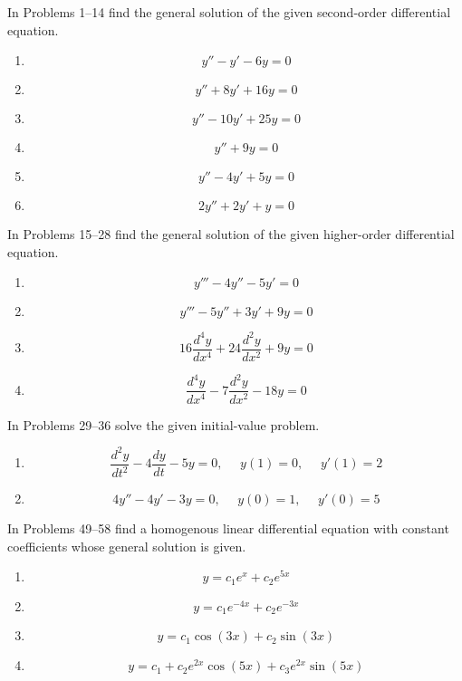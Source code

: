 \documentclass[12pt]{report}
\newcommand{\ivpsep}{\mbox{{ }{ }}}
\begin{document}

In Problems 1--14 find the general solution of the given second-order differential equation.
\begin{enumerate}[label=\arabic*.,start=3]
	\item \[ y'' - y' - 6y = 0 \]				%
	\setcounter{enumi}{4}
	\item \[ y'' + 8y' + 16y = 0 \]				%
	\item \[ y'' - 10y' + 25y = 0 \]			%
	\setcounter{enumi}{8}
	\item \[ y'' + 9y = 0 \] 					%
	\setcounter{enumi}{10}
	\item \[ y'' - 4y' + 5y = 0 \] 				%
	\item \[ 2y'' + 2y' + y = 0 \] 				%
\end{enumerate}

In Problems 15--28 find the general solution of the given higher-order differential equation.
\begin{enumerate}[label=\arabic*.,start=15]
	\item \[ y''' - 4y'' - 5y' = 0 \]										%
	\setcounter{enumi}{16}
	\item \[ y''' - 5y'' + 3y' + 9y = 0 \]									%
	\setcounter{enumi}{24}
	\item \[ 16\frac{d^{4}y}{dx^{4}} + 24\frac{d^{2}y}{dx^{2}} + 9y = 0 \]	%
	\item \[ \frac{d^{4}y}{dx^{4}} - 7\frac{d^{2}y}{dx^{2}} - 18y = 0 \]	%
\end{enumerate}

In Problems 29--36 solve the given initial-value problem.
\begin{enumerate}[label=\arabic*.,start=31]
	\item \[ \frac{d^{2}y}{dt^{2}} - 4\frac{dy}{dt} - 5y = 0,\ivpsep y(1)=0,\ivpsep y'(1)=2 \]			%
	\item \[ 4y'' - 4y' - 3y = 0,\ivpsep y(0)=1,\ivpsep y'(0)=5 \]										%
\end{enumerate}

In Problems 49--58 find a homogenous linear differential equation with constant coefficients whose general solution is given.
\begin{enumerate}[label=\arabic*.,start=49]
	\item \[ y = c_{1}e^{x} + c_{2}e^{5x} \]							%
	\item \[ y = c_{1}e^{-4x} + c_{2}e^{-3x} \]							%
	\setcounter{enumi}{52}
	\item \[ y = c_{1}\cos(3x) + c_{2}\sin(3x) \]						%
	\setcounter{enumi}{55}
	\item \[ y = c_{1} + c_{2}e^{2x}\cos(5x) + c_{3}e^{2x}\sin(5x) \]	%
\end{enumerate}
\end{document}

